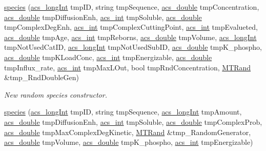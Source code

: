\begin{DoxyCompactItemize}
\hyperlink{a00021_a90d43f697a432915b3b2dfdc7dcc27cf}{species} (\hyperlink{a00050_a19319d75f02db4308bc5c0026d98cd85}{acs\+\_\+long\+Int} tmp\+I\+D, string tmp\+Sequence, \hyperlink{a00050_ab776853a005fcbf56af0424a2a4dd607}{acs\+\_\+double} tmp\+Concentration, \hyperlink{a00050_ab776853a005fcbf56af0424a2a4dd607}{acs\+\_\+double} tmp\+Diffusion\+Enh, \hyperlink{a00050_a8d277355641a098190360234e2ebde35}{acs\+\_\+int} tmp\+Soluble, \hyperlink{a00050_ab776853a005fcbf56af0424a2a4dd607}{acs\+\_\+double} tmp\+Complex\+Deg\+Enh, \hyperlink{a00050_a8d277355641a098190360234e2ebde35}{acs\+\_\+int} tmp\+Complex\+Cutting\+Point, \hyperlink{a00050_a8d277355641a098190360234e2ebde35}{acs\+\_\+int} tmp\+Evalueted, \hyperlink{a00050_ab776853a005fcbf56af0424a2a4dd607}{acs\+\_\+double} tmp\+Age, \hyperlink{a00050_a8d277355641a098190360234e2ebde35}{acs\+\_\+int} tmp\+Reborns, \hyperlink{a00050_ab776853a005fcbf56af0424a2a4dd607}{acs\+\_\+double} tmp\+Volume, \hyperlink{a00050_a19319d75f02db4308bc5c0026d98cd85}{acs\+\_\+long\+Int} tmp\+Not\+Used\+Cat\+I\+D, \hyperlink{a00050_a19319d75f02db4308bc5c0026d98cd85}{acs\+\_\+long\+Int} tmp\+Not\+Used\+Sub\+I\+D, \hyperlink{a00050_ab776853a005fcbf56af0424a2a4dd607}{acs\+\_\+double} tmp\+K\+\_\+phospho, \hyperlink{a00050_ab776853a005fcbf56af0424a2a4dd607}{acs\+\_\+double} tmp\+K\+Load\+Conc, \hyperlink{a00050_a8d277355641a098190360234e2ebde35}{acs\+\_\+int} tmp\+Energizable, \hyperlink{a00050_ab776853a005fcbf56af0424a2a4dd607}{acs\+\_\+double} tmp\+Influx\+\_\+rate, \hyperlink{a00050_a8d277355641a098190360234e2ebde35}{acs\+\_\+int} tmp\+Max\+L\+Out, bool tmp\+Rnd\+Concentration, \hyperlink{a00015}{M\+T\+Rand} \&tmp\+\_\+\+Rnd\+Double\+Gen)
\begin{DoxyCompactList}\small\item\em New random species constructor. \end{DoxyCompactList}\item 
\hyperlink{a00021_a59cb623199b038029a7d63a720408cf5}{species} (\hyperlink{a00050_a19319d75f02db4308bc5c0026d98cd85}{acs\+\_\+long\+Int} tmp\+I\+D, string tmp\+Sequence, \hyperlink{a00050_a19319d75f02db4308bc5c0026d98cd85}{acs\+\_\+long\+Int} tmp\+Amount, \hyperlink{a00050_ab776853a005fcbf56af0424a2a4dd607}{acs\+\_\+double} tmp\+Diffusion\+Enh, \hyperlink{a00050_a8d277355641a098190360234e2ebde35}{acs\+\_\+int} tmp\+Soluble, \hyperlink{a00050_ab776853a005fcbf56af0424a2a4dd607}{acs\+\_\+double} tmp\+Complex\+Prob, \hyperlink{a00050_ab776853a005fcbf56af0424a2a4dd607}{acs\+\_\+double} tmp\+Max\+Complex\+Deg\+Kinetic, \hyperlink{a00015}{M\+T\+Rand} \&tmp\+\_\+\+Random\+Generator, \hyperlink{a00050_ab776853a005fcbf56af0424a2a4dd607}{acs\+\_\+double} tmp\+Volume, \hyperlink{a00050_ab776853a005fcbf56af0424a2a4dd607}{acs\+\_\+double} tmp\+K\+\_\+phospho, \hyperlink{a00050_a8d277355641a098190360234e2ebde35}{acs\+\_\+int} tmp\+Energizable)

\end{DoxyCompactItemize}
